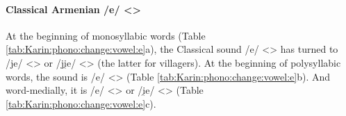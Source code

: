 \begin{table}[H]
	\centering
	\caption{Medial vowel syncope in various Western dialects (Karin, Istanbul)}
	\label{tab:Karin:phono:change:vowel:syncope}
\end{table}


\paragraph{Classical Armenian /e/ <>}


At the beginning of monosyllabic words (Table \ref{tab:Karin:phono:change:vowel:e}a), the Classical sound /e/ <> has turned to /je/ <> or /ji̯e/ <> (the latter for villagers). At the beginning of polysyllabic words, the sound is /e/ <> (Table \ref{tab:Karin:phono:change:vowel:e}b). And word-medially, it is /e/ <> or /i̯e/ <> (Table \ref{tab:Karin:phono:change:vowel:e}c). 




